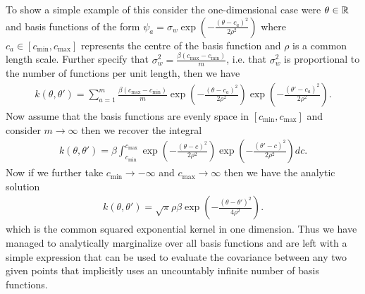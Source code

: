 To show a simple example of this consider the one-dimensional case were $\theta \in \mathbb{R}$ and basis functions of the form  $\psi_a = \sigma_w\exp \left(-\frac{\left( \theta-c_a\right)^2}{2 \rho^2}\right)$ where $c_a \in \left[c_{\min},c_{\max}\right]$ represents the centre of the basis function and $\rho$ is a common length scale.  Further specify that $\sigma_w^2 = \frac{\beta \left(c_{\max}-c_{\min}\right)}{m}$, i.e. that $\sigma_w^2$ is proportional to the number of functions per unit length, then we have
\begin{align}
\label{eq:opt:kSeqExpFinite}
k\left(\theta,\theta'\right) = \sum_{a=1}^{m} \frac{\beta \left(c_{\max}-c_{\min}\right)}{m} \exp \left(-\frac{\left( \theta-c_a\right)^2}{2 \rho^2}\right) \exp \left(-\frac{\left(\theta'-c_a\right)^2}{2 \rho^2}\right).
\end{align}
Now assume that the basis functions are evenly space in $\left[c_{\min},c_{\max}\right]$ and consider $m \rightarrow \infty$ then we recover the integral
\begin{align}
\label{eq:opt:kSeqExpIntegral}
k\left(\theta,\theta'\right) = \beta \int_{c_{\min}}^{c_{\max}}  \exp \left(-\frac{\left( \theta-c\right)^2}{2 \rho^2}\right) \exp \left(-\frac{\left(\theta'-c\right)^2}{2 \rho^2}\right) dc.
\end{align}
Now if we further take $c_{\min} \rightarrow -\infty$ and $c_{\max} \rightarrow \infty$ then we have the analytic solution
\begin{align}
\label{eq:opt:seqExpProof}
k\left(\theta,\theta'\right) = \sqrt{\pi} \rho \beta \exp \left(-\frac{\left(\theta-\theta'\right)^2}{4 \rho^2}\right).
\end{align}
which is the common squared exponential kernel in one dimension.  Thus we have managed to analytically marginalize over all basis functions and are left with a simple expression that can be used to evaluate the covariance between any two given points that implicitly uses an uncountably infinite number of basis functions.

